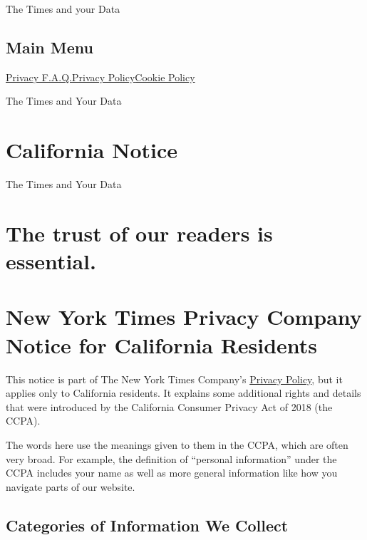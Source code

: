 The Times and your Data

\hypertarget{main-menu}{%
\subsection{Main Menu}\label{main-menu}}

\href{/privacy}{Privacy F.A.Q.}\href{/privacy/privacy-policy}{Privacy
Policy}\href{/privacy/cookie-policy}{Cookie Policy}

The Times and Your Data

\hypertarget{california-notice}{%
\section{California Notice}\label{california-notice}}

The Times and Your Data

\hypertarget{the-trust-of-our-readers-is-essential}{%
\section{The trust of our readers is
essential.}\label{the-trust-of-our-readers-is-essential}}

\hypertarget{new-york-times-privacy-company-notice-for-california-residents}{%
\section{New York Times Privacy Company Notice for California
Residents}\label{new-york-times-privacy-company-notice-for-california-residents}}

This notice is part of The New York Times Company's
\href{/privacy/privacy-policy}{Privacy Policy}, but it applies only to
California residents. It explains some additional rights and details
that were introduced by the California Consumer Privacy Act of 2018 (the
CCPA).

The words here use the meanings given to them in the CCPA, which are
often very broad. For example, the definition of ``personal
information'' under the CCPA includes your name as well as more general
information like how you navigate parts of our website.

\hypertarget{categories-of-information-we-collect}{%
\subsection{Categories of Information We
Collect}\label{categories-of-information-we-collect}}

